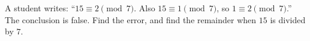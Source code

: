 A student writes: ``$15\equiv2\pmod 7$. Also $15\equiv1\pmod 7$, so $1\equiv2\pmod7$.'' The conclusion is false. Find the error, and find the remainder when $15$ is divided by $7$.
